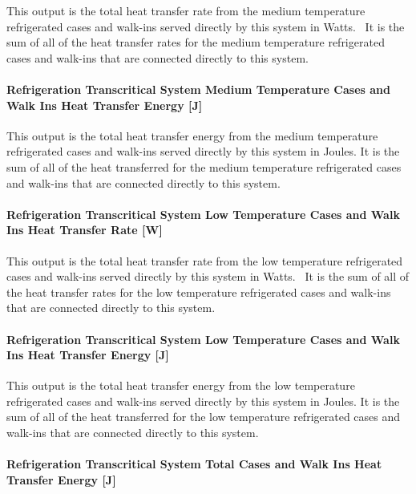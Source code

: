 This output is the total heat transfer rate from the medium temperature refrigerated cases and walk-ins served directly by this system in Watts.~ It is the sum of all of the heat transfer rates for the medium temperature refrigerated cases and walk-ins that are connected directly to this system.

\paragraph{Refrigeration Transcritical System Medium Temperature Cases and Walk Ins Heat Transfer Energy {[}J{]}}\label{refrigeration-transcritical-system-medium-temperature-cases-and-walk-ins-heat-transfer-energy-j}

This output is the total heat transfer energy from the medium temperature refrigerated cases and walk-ins served directly by this system in Joules. It is the sum of all of the heat transferred for the medium temperature refrigerated cases and walk-ins that are connected directly to this system.

\paragraph{Refrigeration Transcritical System Low Temperature Cases and Walk Ins Heat Transfer Rate {[}W{]}}\label{refrigeration-transcritical-system-low-temperature-cases-and-walk-ins-heat-transfer-rate-w}

This output is the total heat transfer rate from the low temperature refrigerated cases and walk-ins served directly by this system in Watts.~ It is the sum of all of the heat transfer rates for the low temperature refrigerated cases and walk-ins that are connected directly to this system.

\paragraph{Refrigeration Transcritical System Low Temperature Cases and Walk Ins Heat Transfer Energy {[}J{]}}\label{refrigeration-transcritical-system-low-temperature-cases-and-walk-ins-heat-transfer-energy-j}

This output is the total heat transfer energy from the low temperature refrigerated cases and walk-ins served directly by this system in Joules. It is the sum of all of the heat transferred for the low temperature refrigerated cases and walk-ins that are connected directly to this system.

\paragraph{Refrigeration Transcritical System Total Cases and Walk Ins Heat Transfer Energy {[}J{]}}\label{refrigeration-transcritical-system-total-cases-and-walk-ins-heat-transfer-energy-j}

